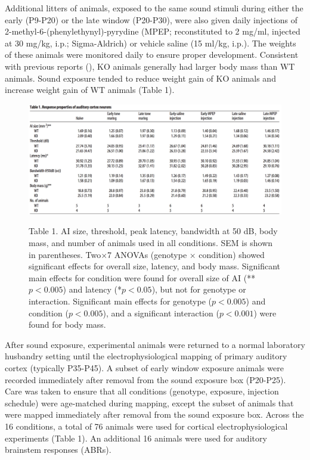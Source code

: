 Additional litters of animals, exposed to the same sound stimuli during either the early (P9-P20) or the late window (P20-P30), were also given daily injections of 2-methyl-6-(phenylethynyl)-pyrydine (MPEP; reconstituted to 2 mg/ml, injected at 30 mg/kg, i.p.; Sigma-Aldrich) or vehicle saline (15 ml/kg, i.p.). The weights of these animals were monitored daily to ensure proper development. Consistent with previous reports (\cite{Moy2009}), KO animals generally had larger body mass than WT animals. Sound exposure tended to reduce weight gain of KO animals and increase weight gain of WT animals (Table 1).

\begin{figure}
	\centering
		\includegraphics[width=7in]{images/C2T1}
	\begin{changemargin}{1in}{1in}
	\footnotesize{Table 1. AI size, threshold, peak latency, bandwidth at 50 dB, body mass, and number of animals used in all conditions. SEM is shown in parentheses. Two$\times$7 ANOVAs (genotype $\times$ condition) showed significant effects for overall size, latency, and body mass. Significant main effects for condition were found for overall size of AI (**$p<0.005$) and latency (*$p<0.05$), but not for genotype or interaction. Significant main effects for genotype ($p<0.005$) and condition ($p<0.005$), and a significant interaction ($p<0.001$) were found for body mass.}
	\end{changemargin}
\end{figure}

After sound exposure, experimental animals were returned to a normal laboratory husbandry setting until the electrophysiological mapping of primary auditory cortex (typically P35-P45). A subset of early window exposure animals were recorded immediately after removal from the sound exposure box (P20-P25). Care was taken to ensure that all conditions (genotype, exposure, injection schedule) were age-matched during mapping, except the subset of animals that were mapped immediately after removal from the sound exposure box. Across the 16 conditions, a total of 76 animals were used for cortical electrophysiological experiments (Table 1). An additional 16 animals were used for auditory brainstem responses (ABRs).

